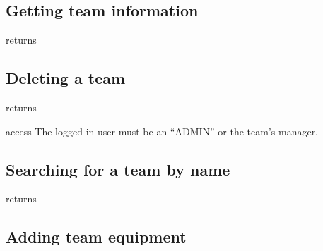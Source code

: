 \subsection{Getting team information}

\begin{apidata}{returns}
  \begin{datalist}
  \end{datalist}
\end{apidata}


\subsection{Deleting a team}

\begin{apidata}{returns}
  \begin{datalist}
  \end{datalist}
\end{apidata}
\begin{apidata}{access}
The logged in user must be an ``ADMIN'' or the team's manager.
\end{apidata}


\subsection{Searching for a team by name}
\label{sec:call:team:name}

\begin{apidata}{returns}
  \begin{datalist}
  \end{datalist}
\end{apidata}

\subsection{Adding team equipment}

